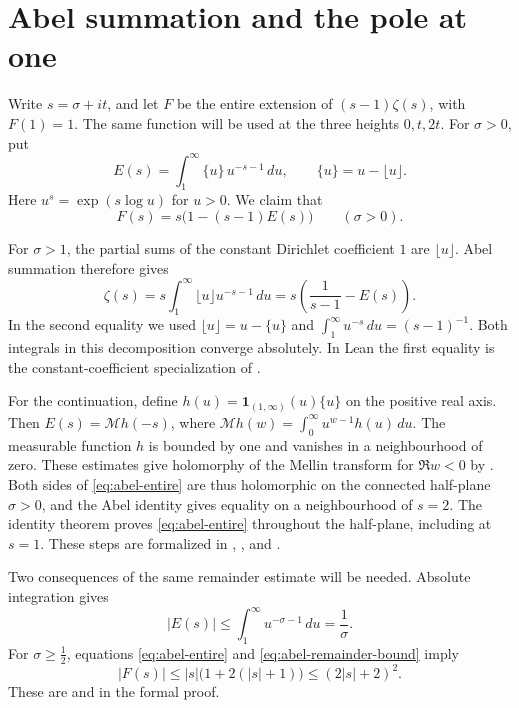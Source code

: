 \section{Abel summation and the pole at one}
\label{sec:abel-growth}

Write \(s=\sigma+it\), and let \(F\) be the entire extension of
\((s-1)\zeta(s)\), with \(F(1)=1\). The same function will be used at the
three heights \(0,t,2t\). For \(\sigma>0\), put
\[
  E(s)=\int_1^\infty \{u\}\,u^{-s-1}\,du,
  \qquad \{u\}=u-\lfloor u\rfloor .
\]
Here \(u^s=\exp(s\log u)\) for \(u>0\). We claim that
\begin{equation}
  F(s)=s\bigl(1-(s-1)E(s)\bigr)
  \qquad (\sigma>0).
  \label{eq:abel-entire}
\end{equation}

For \(\sigma>1\), the partial sums of the constant Dirichlet coefficient
\(1\) are \(\lfloor u\rfloor\). Abel summation therefore gives
\[
  \zeta(s)
  =s\int_1^\infty \lfloor u\rfloor u^{-s-1}\,du
  =s\left(\frac{1}{s-1}-E(s)\right).
\]
In the second equality we used \(\lfloor u\rfloor=u-\{u\}\) and
\(\int_1^\infty u^{-s}\,du=(s-1)^{-1}\). Both integrals in this
decomposition converge absolutely. In Lean the first equality is the
constant-coefficient specialization of .

For the continuation, define \(h(u)=\mathbf{1}_{(1,\infty)}(u)\{u\}\)
on the positive real axis. Then
\(E(s)=\mathcal{M}h(-s)\), where
\(\mathcal{M}h(w)=\int_0^\infty u^{w-1}h(u)\,du\).
The measurable function \(h\) is bounded by one and vanishes in a
neighbourhood of zero. These estimates give holomorphy of the Mellin
transform for \(\Re w<0\) by
. Both sides of
\eqref{eq:abel-entire} are thus holomorphic on the connected half-plane
\(\sigma>0\), and the Abel identity gives equality on a neighbourhood of
\(s=2\). The identity theorem proves \eqref{eq:abel-entire} throughout the
half-plane, including at \(s=1\). These steps are formalized in
, , and .

Two consequences of the same remainder estimate will be needed. Absolute
integration gives
\begin{equation}
  |E(s)|\leq\int_1^\infty u^{-\sigma-1}\,du=\frac{1}{\sigma}.
  \label{eq:abel-remainder-bound}
\end{equation}
For \(\sigma\geq \tfrac12\), equations \eqref{eq:abel-entire}
and \eqref{eq:abel-remainder-bound} imply
\begin{equation}
  |F(s)|\leq |s|\bigl(1+2(|s|+1)\bigr)
           \leq (2|s|+2)^2 .
  \label{eq:quadratic-growth}
\end{equation}
These are  and  in the formal proof.

